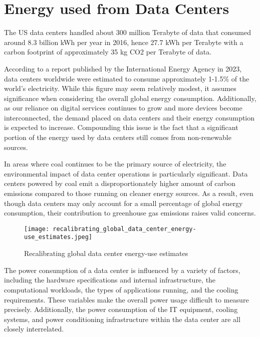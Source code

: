 \documentclass[
  a4paper,  %
  twoside,  %
  bibliography=totoc,
  headsepline,
  cleardoublepage=empty,
  parskip=half,
  draft=false
]{scrbook}
\begin{document}



\chapter{Energy used from Data Centers}

The US data centers handled about 300 million Terabyte of data that consumed around 8.3 billion kWh per year in 2016, hence 27.7 kWh per Terabyte with a carbon footprint of approximately 35 kg CO2 per Terabyte of data\cite{corbett2018sustainable}.

According to a report published by the International Energy Agency\cite{ieaDataCentres} in 2023, data centers worldwide were estimated to consume approximately 1-1.5\% of the world's electricity. While this figure may seem relatively modest, it assumes significance when considering the overall global energy consumption. Additionally, as our reliance on digital services continues to grow and more devices become interconnected, the demand placed on data centers and their energy consumption is expected to increase\cite{schomaker2015energy}. Compounding this issue is the fact that a significant portion of the energy used by data centers still comes from non-renewable sources\cite{ritchie2024energy}.

In areas where coal continues to be the primary source of electricity, the environmental impact of data center operations is particularly significant\cite{finkelman2021future}. Data centers powered by coal emit a disproportionately higher amount of carbon emissions compared to those running on cleaner energy sources. As a result, even though data centers may only account for a small percentage of global energy consumption, their contribution to greenhouse gas emissions raises valid concerns.


\begin{figure}
	\centering
	\texttt{[image: recalibrating\_global\_data\_center\_energy-use\_estimates.jpeg]}
	\caption{Recalibrating global data center energy-use estimates\cite{doi:10.1126/science.aba3758}}
\end{figure}

The power consumption of a data center is influenced by a variety of factors, including the hardware specifications and internal infrastructure, the computational workloads, the types of applications running, and the cooling requirements\cite{dayarathna2015data}. These variables make the overall power usage difficult to measure precisely. Additionally, the power consumption of the IT equipment, cooling systems, and power conditioning infrastructure within the data center are all closely interrelated.
\end{document}
